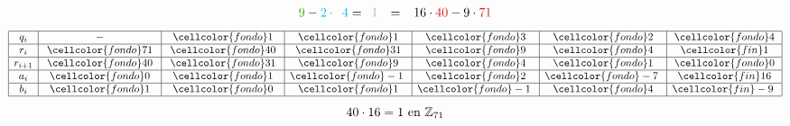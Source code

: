 \documentclass[10pt,t]{beamer}
\begin{document}
\begin{frame}
{\begin{plainexample}
\[\begin{array}{rl}
            \textcolor{miVerde}   {9} - \textcolor{miAzul}{2\cdot\phantom{3}4}  = \phantom{3}\textcolor{fin}   {1}
            &=     \phantom{-}16          \cdot\textcolor{miRojo}{40}           -9\cdot\textcolor{miRojo}{71} 
        \end{array}
        \]
        \[
            \begin{array}{|c|c|c|c|c|c|c|}
                \hline
                q_i  &  -                  &\cellcolor{fondo}1  &\cellcolor{fondo}1  &\cellcolor{fondo}3 &\cellcolor{fondo}2  & \cellcolor{fondo}4 \\
                \hline
                r_i  &\phantom{l}\cellcolor{fondo}71\phantom{l} &\phantom{l}\cellcolor{fondo}40\phantom{l} &\cellcolor{fondo}31 &\cellcolor{fondo}9 &\cellcolor{fondo}4  &\cellcolor{fin} 1 \\
                \hline
                r_{i+1} &\cellcolor{fondo}40 &\cellcolor{fondo}31 &\cellcolor{fondo}9  &\cellcolor{fondo}4 &\cellcolor{fondo} 1 & \cellcolor{fondo}0 \\
                \hline
                a_i     &\cellcolor{fondo}0  &\cellcolor{fondo}1  &\cellcolor{fondo}-1\phantom{l} &\cellcolor{fondo}2 &\cellcolor{fondo} -7\phantom{l}&\cellcolor{fin}16 \\
                \hline
                b_i &\cellcolor{fondo}   1   &\cellcolor{fondo}0  &\cellcolor{fondo}1  &\cellcolor{fondo}-1\phantom{l}&\cellcolor{fondo}4  &\cellcolor{fin}-9\phantom{l} \\
                \hline
            \end{array}
        \]
        \[40 \cdot 16 = 1 \text{ en } \mathbb{Z}_{71}\]
    \end{plainexample}
    }

\end{frame}
\end{document}
